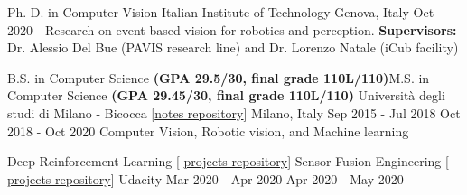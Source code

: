 

\begin{cventries}

  \cventry
{Ph. D.  in Computer Vision} %
{Italian Institute of Technology} %
{Genova, Italy} %
{Oct 2020 -} %
{Research on event-based vision for robotics and perception. \linebreak \textbf{Supervisors:} Dr. Alessio Del Bue (PAVIS research line) and Dr. Lorenzo Natale (iCub facility)}

  \vspace{0.3cm}

  \cventry
  {B.S. in Computer Science \textbf{(GPA 29.5/30, final grade 110L/110)}\linebreak M.S. in Computer Science \textbf{(GPA 29.45/30, final grade 110L/110)}  } %
  {Università degli studi di Milano - Bicocca  {\tiny [\href{https://github.com/gianscarpe/unimib}{notes repository}]} } %
  {Milano, Italy} %
  {Sep 2015 - Jul 2018 \linebreak Oct 2018 - Oct 2020} %
  {Computer Vision, Robotic vision, and Machine learning
  }

  \cventry
  {Deep Reinforcement Learning {\tiny [ \href{https://github.com/gianscarpe/udacity_deep_reinforcement_learning}{projects repository}]} 	
    \linebreak
    Sensor Fusion Engineering {\tiny [ \href{https://github.com/gianscarpe/udacity_sensor_fusion}{projects repository}]}
  } %
  {Udacity} %
  {} %
  {Mar 2020 - Apr 2020 \linebreak Apr 2020 - May 2020} %
  {
  }
  \vspace{-0.7cm}
\end{cventries}
